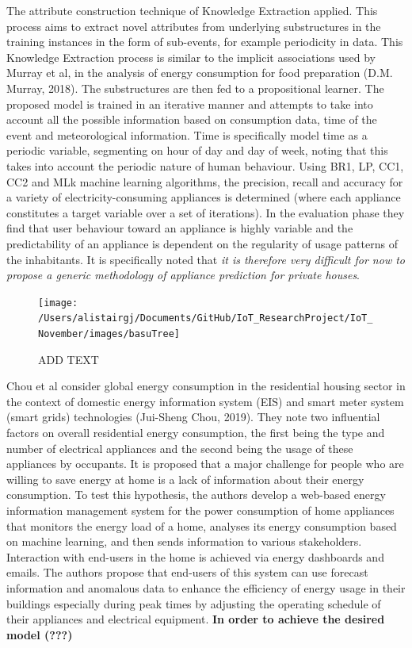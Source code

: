 \documentclass[11pt,]{article}
\begin{document}
The attribute construction technique of Knowledge Extraction applied.
This process aims to extract novel attributes from underlying
substructures in the training instances in the form of sub-events, for
example periodicity in data. This Knowledge Extraction process is
similar to the implicit associations used by Murray et al, in the
analysis of energy consumption for food preparation (D.M. Murray, 2018).
The substructures are then fed to a propositional learner. The proposed
model is trained in an iterative manner and attempts to take into
account all the possible information based on consumption data, time of
the event and meteorological information. Time is specifically model
time as a periodic variable, segmenting on hour of day and day of week,
noting that this takes into account the periodic nature of human
behaviour. Using BR1, LP, CC1, CC2 and MLk machine learning algorithms,
the precision, recall and accuracy for a variety of
electricity-consuming appliances is determined (where each appliance
constitutes a target variable over a set of iterations). In the
evaluation phase they find that user behaviour toward an appliance is
highly variable and the predictability of an appliance is dependent on
the regularity of usage patterns of the inhabitants. It is specifically
noted that \emph{it is therefore very difficult for now to propose a
generic methodology of appliance prediction for private houses}.

\begin{figure}[H]

{\centering \texttt{[image: /Users/alistairgj/Documents/GitHub/IoT\_ResearchProject/IoT\_November/images/basuTree]} 

}

\caption{ADD TEXT}\label{fig:unnamed-chunk-5}
\end{figure}

Chou et al consider global energy consumption in the residential housing
sector in the context of domestic energy information system (EIS) and
smart meter system (smart grids) technologies (Jui-Sheng Chou, 2019).
They note two influential factors on overall residential energy
consumption, the first being the type and number of electrical
appliances and the second being the usage of these appliances by
occupants. It is proposed that a major challenge for people who are
willing to save energy at home is a lack of information about their
energy consumption. To test this hypothesis, the authors develop a
web-based energy information management system for the power consumption
of home appliances that monitors the energy load of a home, analyses its
energy consumption based on machine learning, and then sends information
to various stakeholders. Interaction with end-users in the home is
achieved via energy dashboards and emails. The authors propose that
end-users of this system can use forecast information and anomalous data
to enhance the efficiency of energy usage in their buildings especially
during peak times by adjusting the operating schedule of their
appliances and electrical equipment. \textbf{In order to achieve the
desired model (???)}
\end{document}
